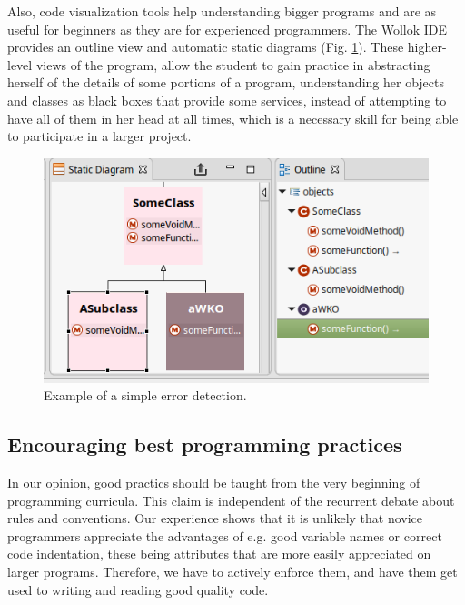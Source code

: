 Also, code visualization tools help understanding bigger programs and are as useful for beginners as they are for experienced programmers.
The Wollok IDE provides an outline view and automatic static diagrams (\cf Fig. \ref{fig:outline}).
These higher-level views of the program, allow the student to gain practice in abstracting herself of the details of some portions of a program, understanding her objects and classes as black boxes that provide some services, instead of attempting to have all of them in her head at all times, which is a necessary skill for being able to participate in a larger project.

\begin{figure}[ht]
 \centering
 \includegraphics[scale=0.5]{images/outline.png}
 \caption{\small Example of a simple error detection.}
 \label{fig:outline}
\end{figure}


\subsection{Encouraging best programming practices}
In our opinion, good practics should be taught from the very beginning of programming curricula. This claim is independent of the recurrent debate about rules and conventions. 
Our experience shows that it is unlikely that novice programmers appreciate the advantages of e.g. good variable names or correct code indentation, these being attributes that are more easily appreciated on larger programs.
Therefore, we have to actively enforce them, and have them get used to writing and reading good quality code.

